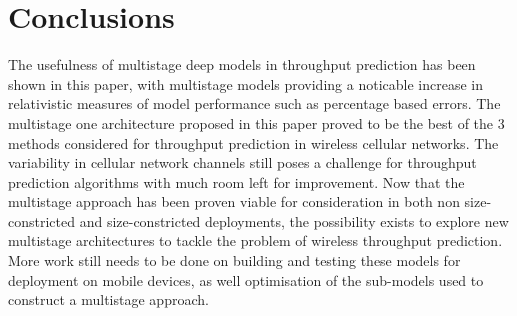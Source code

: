 \chapter{Conclusions}
The usefulness of multistage deep models in throughput prediction has been shown in this paper, with multistage models providing a noticable increase in relativistic measures of model performance such as percentage based errors. The multistage one architecture proposed in this paper proved to be the best of the 3 methods considered for throughput prediction in wireless cellular networks. The variability in cellular network channels still poses a challenge for throughput prediction algorithms with much room left for improvement. Now that the multistage approach has been proven viable for consideration in both non size-constricted and size-constricted deployments, the possibility exists to explore new multistage architectures to tackle the problem of wireless throughput prediction. More work still needs to be done on building and testing these models for deployment on mobile devices, as well optimisation of the sub-models used to construct a multistage approach.